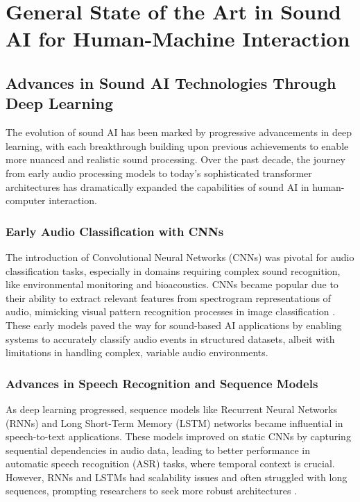 \section{General State of the Art in Sound AI for Human-Machine Interaction}

\subsection{Advances in Sound AI Technologies Through Deep Learning}

The evolution of sound AI has been marked by progressive advancements in deep learning, with each breakthrough building upon previous achievements to enable more nuanced and realistic sound processing. Over the past decade, the journey from early audio processing models to today’s sophisticated transformer architectures has dramatically expanded the capabilities of sound AI in human-computer interaction.

\subsubsection{Early Audio Classification with CNNs}
The introduction of Convolutional Neural Networks (CNNs) was pivotal for audio classification tasks, especially in domains requiring complex sound recognition, like environmental monitoring and bioacoustics. CNNs became popular due to their ability to extract relevant features from spectrogram representations of audio, mimicking visual pattern recognition processes in image classification \cite{purwins2019deep}. These early models paved the way for sound-based AI applications by enabling systems to accurately classify audio events in structured datasets, albeit with limitations in handling complex, variable audio environments.

\subsubsection{Advances in Speech Recognition and Sequence Models}
As deep learning progressed, sequence models like Recurrent Neural Networks (RNNs) and Long Short-Term Memory (LSTM) networks became influential in speech-to-text applications\cite{purwins2019deep}. These models improved on static CNNs by capturing sequential dependencies in audio data, leading to better performance in automatic speech recognition (ASR) tasks, where temporal context is crucial. However, RNNs and LSTMs had scalability issues and often struggled with long sequences, prompting researchers to seek more robust architectures \cite{dong2018speech}.

